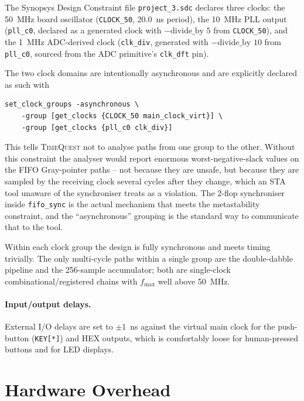 \documentclass[12pt,letterpaper]{article}
\begin{document}
The Synopsys Design Constraint file \texttt{project\_3.sdc} declares three
clocks: the 50~MHz board oscillator (\texttt{CLOCK\_50}, 20.0~ns period), the
10~MHz PLL output (\texttt{pll\_c0}, declared as a generated clock with
\(-\text{divide\_by 5}\) from \texttt{CLOCK\_50}), and the 1~MHz ADC-derived
clock (\texttt{clk\_div}, generated with \(-\text{divide\_by 10}\) from
\texttt{pll\_c0}, sourced from the ADC primitive's \texttt{clk\_dft} pin).

The two clock domains are intentionally asynchronous and are explicitly
declared as such with

\begin{lstlisting}[basicstyle=\ttfamily\small]
set_clock_groups -asynchronous \
    -group [get_clocks {CLOCK_50 main_clock_virt}] \
    -group [get_clocks {pll_c0 clk_div}]
\end{lstlisting}

This tells \textsc{TimeQuest} not to analyse paths from one group to the
other.  Without this constraint the analyser would report enormous
worst-negative-slack values on the FIFO Gray-pointer paths -- not because
they are unsafe, but because they are sampled by the receiving clock several
cycles after they change, which an STA tool unaware of the synchroniser
treats as a violation.  The 2-flop synchroniser inside \texttt{fifo\_sync} is
the actual mechanism that meets the metastability constraint, and the
``asynchronous'' grouping is the standard way to communicate that to the
tool.

Within each clock group the design is fully synchronous and meets timing
trivially.  The only multi-cycle paths within a single group are the
double-dabble pipeline and the 256-sample accumulator; both are
single-clock combinational/registered chains with $f_{\text{max}}$ well above
50~MHz.

\paragraph{Input/output delays.}  External I/O delays are set to \(\pm 1\)~ns
against the virtual main clock for the push-button (\texttt{KEY[*]}) and HEX
outputs, which is comfortably loose for human-pressed buttons and for LED
displays.

\section{Hardware Overhead}
\label{sec:overhead}
\end{document}
